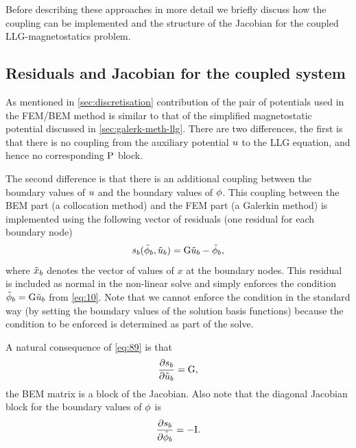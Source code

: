 Before describing these approaches in more detail we briefly discuss how the coupling can be implemented and the structure of the Jacobian for the coupled LLG-magnetostatics problem.

\subsection{Residuals and Jacobian for the coupled system}
\label{sec:bem-jacobian-structure}

As mentioned in \cref{sec:discretisation} contribution of the pair of potentials used in the FEM/BEM method is similar to that of the simplified magnetostatic potential discussed in \cref{sec:galerk-meth-llg}.
There are two differences, the first is that there is no coupling from the auxiliary potential $u$ to the LLG equation, and hence no corresponding $\mathrm{P}$ block.

The second difference is that there is an additional coupling between the boundary values of $u$ and the boundary values of $\phi$.
This coupling between the BEM part (a collocation method) and the FEM part (a Galerkin method) is implemented using the following vector of residuals (one residual for each boundary node)
\newcommand{\rphimb}{\rphi_b}
\begin{equation}
  \rphimb(\phimdis_b, \phionedis_b) = \bm \phionedis_b - \phimdis_b,
  \label{eq:89}
\end{equation}
where $\tilde{x}_b$ denotes the vector of values of $x$ at the boundary nodes.
This residual is included as normal in the non-linear solve and simply enforces the condition $\tilde{\phi}_b = {\mathbf{\mathrm{G}}} \tilde{u}_b$ from \cref{eq:10}.
Note that we cannot enforce the condition in the standard way (by setting the boundary values of the solution basis functions) because the condition to be enforced is determined as part of the solve.

A natural consequence of \cref{eq:89} is that
\begin{equation}
  \pd{\rphimb}{\phionedis_b} = \bm,
\end{equation}
\ie the BEM matrix is a block of the Jacobian.
Also note that the diagonal Jacobian block for the boundary values of $\phi$ is
\begin{equation}
  \pd{\rphimb}{\phimdis_b} = -\Idm.
\end{equation}


